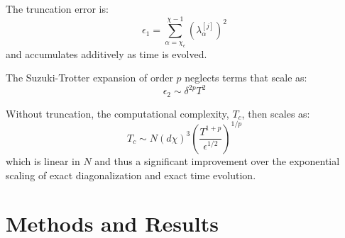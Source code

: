 \documentclass[a4paper, headsepline, footheight=13.6pt]{scrartcl}
\begin{document}
The truncation error is:
\begin{equation}
    \epsilon_1 = \sum_{\alpha = \chi_\epsilon}^{\chi-1} (\lambda_\alpha^{[j]})^2
\end{equation}
and accumulates additively as time is evolved.

The Suzuki-Trotter expansion of order $p$ neglects terms that scale as:
\begin{equation}
    \epsilon_2 \sim \delta^{2p} T^2
\end{equation}

Without truncation, the computational complexity, $T_c$, then scales as:
\begin{equation}
    T_c \sim N(d\chi)^3\left(\frac{T^{1+p}}{\epsilon^{1/2}}\right)^{1/p}
\end{equation}
which is linear in $N$ and thus a significant improvement over the exponential scaling of exact diagonalization and exact time evolution.

\section{Methods and Results} \label{sec:results}
\end{document}
